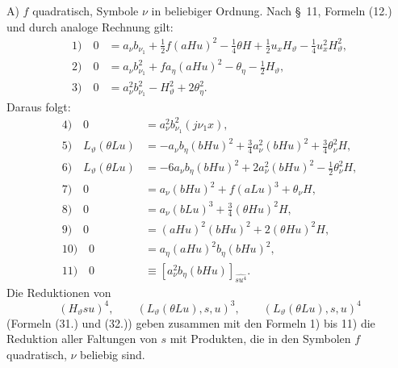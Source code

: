 \documentclass[11pt]{article}
\begin{document}
A) $f$ quadratisch, Symbole $\nu$ in beliebiger Ordnung. Nach \S\ 11, Formeln (12.) und durch analoge Rechnung gilt:
\begin{align*}
1)\quad 0&=a_\nu b_{\nu_1}+\frac12f(aHu)^2-\frac14\theta H+\frac12u_xH_\vartheta-\frac14u_x^2H_\vartheta^2,\\
2)\quad 0&=a_\nu b_{\nu_1}^2+f a_\eta(aHu)^2-\theta_\eta-\frac12H_\vartheta,\\
3)\quad 0&=a_\nu^2b_{\nu_1}^2-H_\vartheta^2+2\theta_\eta^2.
\end{align*}
Daraus folgt:
\begin{align*}
4)\quad 0&=a_\nu^2b_{\nu_1}^2(j\nu_1x),\\
5)\quad L_\vartheta(\theta Lu)&=-a_\nu b_\eta(bHu)^2+\frac34a_\nu^2(bHu)^2+\frac34\theta_\nu^2H,\\
6)\quad L_\vartheta(\theta Lu)&=-6a_\nu b_\eta(bHu)^2+2a_\nu^2(bHu)^2-\frac12\theta_\nu^2H,\\
7)\quad 0&=a_\nu(bHu)^2+f(aLu)^3+\theta_\nu H,\\
8)\quad 0&=a_\nu(bLu)^3+\frac34(\theta Hu)^2H,\\
9)\quad 0&=(aHu)^2(bHu)^2+2(\theta Hu)^2H,\\
10)\quad 0&=a_\eta(aHu)^2b_\eta(bHu)^2,\\
11)\quad 0&\equiv [a_\nu^2b_\eta(bHu)]_{\widehat{su^4}}.
\end{align*}
Die Reduktionen von
\[
(H_\vartheta su)^4,
\qquad (L_\vartheta(\theta Lu),s,u)^3,
\qquad (L_\vartheta(\theta Lu),s,u)^4
\]
(Formeln (31.) und (32.)) geben zusammen mit den Formeln 1) bis 11) die Reduktion aller Faltungen von $s$ mit Produkten, die in den Symbolen $f$ quadratisch, $\nu$ beliebig sind.
\end{document}
